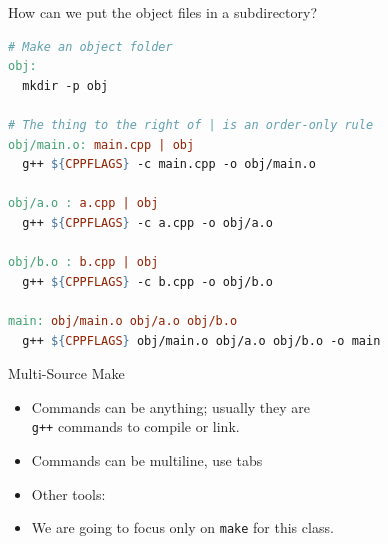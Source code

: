 \documentclass[14pt,aspectratio=1610]{beamer}
\begin{document}
\begin{frame}[fragile]{How can we put the object files in a subdirectory?}

\pause
\begin{lstlisting}[basicstyle=\footnotesize\ttfamily, language=make, firstnumber=6]
# Make an object folder
obj:
  mkdir -p obj

# The thing to the right of | is an order-only rule
obj/main.o: main.cpp | obj
  g++ ${CPPFLAGS} -c main.cpp -o obj/main.o

obj/a.o : a.cpp | obj
  g++ ${CPPFLAGS} -c a.cpp -o obj/a.o

obj/b.o : b.cpp | obj
  g++ ${CPPFLAGS} -c b.cpp -o obj/b.o

main: obj/main.o obj/a.o obj/b.o
  g++ ${CPPFLAGS} obj/main.o obj/a.o obj/b.o -o main
\end{lstlisting}
\end{frame}

\begin{frame}{Multi-Source Make}
\begin{itemize}
\item Commands can be anything; usually they are \\\texttt{g++} commands to compile or link.
\item Commands can be multiline, use tabs
\item Other tools:
\item We are going to focus only on \texttt{make} for this class.
\end{itemize}
\end{frame}
\end{document}
